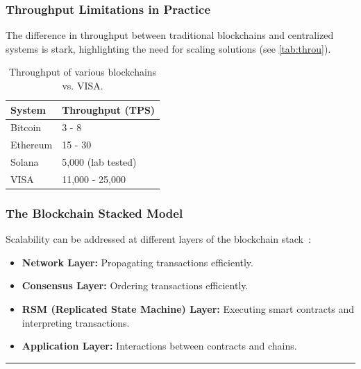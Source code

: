 \subsubsection{Throughput Limitations in
Practice}\label{throughput-limitations-in-practice}

The difference in throughput between traditional blockchains and
centralized systems is stark, highlighting the need for scaling
solutions (see \autoref{tab:throu}).

\begin{table}
\centering


\begin{tabular}{ll}

	\toprule
	\textbf{System} & \textbf{Throughput (TPS)} \\
	\midrule
	Bitcoin & 3 - 8  \\
	Ethereum & 15 - 30 \\
	Solana & 5,000  (lab tested) \\
	VISA & 11,000 - 25,000  \\
	\bottomrule
\end{tabular}
	\caption{Throughput of various blockchains vs. VISA.}\label{tab:throu}
	
\end{table}


\subsubsection{The Blockchain Stacked
Model}\label{the-blockchain-stacked-model}

Scalability can be addressed at different layers of the blockchain
stack~\cite{homoliak2020security}:


\begin{itemize}
\tightlist
\item
  \textbf{Network Layer:} Propagating transactions efficiently.
\item
  \textbf{Consensus Layer:} Ordering transactions efficiently.
\item
  \textbf{RSM (Replicated State Machine) Layer:} Executing smart
  contracts and interpreting transactions.
\item
  \textbf{Application Layer:} Interactions between contracts and chains.
\end{itemize}

\begin{center}\rule{0.5\linewidth}{0.5pt}\end{center}

